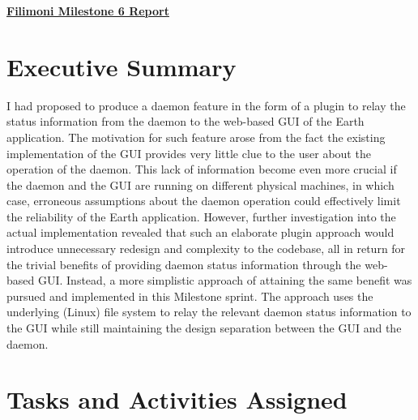 
\pagestyle{headings}

\begin{center}
{\large\textbf{\underline{{Filimoni Milestone 6 Report}}}}
\end{center}

\section*{Executive Summary}

I had proposed to produce a daemon feature in the form of a plugin to relay the status information from the daemon to the web-based GUI of the Earth application. The motivation for such feature arose from the fact the existing implementation of the GUI provides very little clue to the user about the operation of the daemon. This lack of information become even more crucial if the daemon and the GUI are running on different physical machines, in which case, erroneous assumptions about the daemon operation could effectively limit the reliability of the Earth application. However, further investigation into the actual implementation revealed that such an elaborate plugin approach would introduce unnecessary redesign and complexity to the codebase, all in return for the trivial benefits of providing daemon status information through the web-based GUI. Instead, a more simplistic approach of attaining the same benefit was pursued and implemented in this Milestone sprint. The approach uses the underlying (Linux) file system to relay the relevant daemon status information to the GUI while still maintaining the design separation between the GUI and the daemon.

\section*{Tasks and Activities Assigned}

